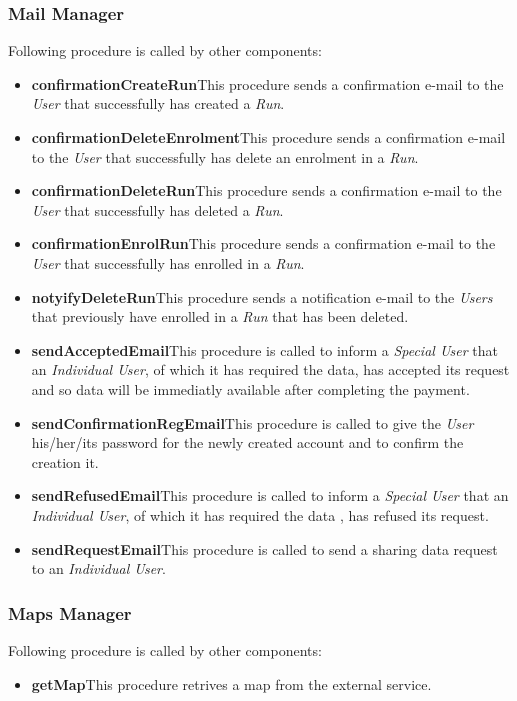 \subsubsection{Mail Manager}
Following procedure is called by other components:
\begin{itemize}
  \item \textbf{confirmationCreateRun}\quad This procedure sends a confirmation e-mail to the \textit{User} that successfully has created a \textit{Run}.
  \item \textbf{confirmationDeleteEnrolment}\quad This procedure sends a confirmation e-mail to the \textit{User} that successfully has delete an enrolment in a \textit{Run}.
  \item \textbf{confirmationDeleteRun}\quad This procedure sends a confirmation e-mail to the \textit{User} that successfully has deleted a \textit{Run}.
  \item \textbf{confirmationEnrolRun}\quad This procedure sends a confirmation e-mail to the \textit{User} that successfully has enrolled in a \textit{Run}.
  \item \textbf{notyifyDeleteRun}\quad This procedure sends a notification e-mail to the \textit{Users} that previously have enrolled in a \textit{Run} that has been deleted.
  \item \textbf{sendAcceptedEmail}\quad This procedure is called to inform a \textit{Special User} that an \textit{Individual User}, of which it has required the data, has accepted its request and so data will be immediatly available after completing the payment.
  \item \textbf{sendConfirmationRegEmail}\quad This procedure is called to give the \textit{User} his/her/its password for the newly created account and to confirm the creation it.
  \item \textbf{sendRefusedEmail}\quad This procedure is called to inform a \textit{Special User} that an \textit{Individual User}, of which it has required the data , has refused its request.
  \item \textbf{sendRequestEmail}\quad This procedure is called to send a sharing data request to an \textit{Individual User}.
\end{itemize}

\subsubsection{Maps Manager}
Following procedure is called by other components:
\begin{itemize}
  \item \textbf{getMap}\quad This procedure retrives a map from the external service.
\end{itemize}

